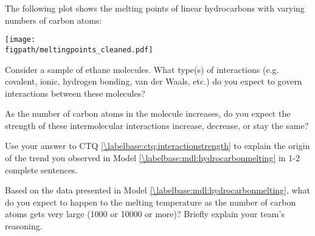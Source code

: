 \begin{activity}
\begin{model}
	The following plot shows the melting points of linear hydrocarbons with varying numbers of carbon atoms:
	
	\vspace{6pt}
	
	\centerline{\texttt{[image: \\figpath/meltingpoints\_cleaned.pdf]}}
	
	\vspace{6pt}

\end{model}

\begin{ctqs}

	
	
	\question Consider a sample of ethane molecules.  What type(s) of interactions (e.g. covalent, ionic, hydrogen bonding, van der Waals, etc.) do you expect to govern interactions between these molecules?%
	
		\begin{solution}[0.5in]
		\end{solution}
	
	\question As the number of carbon atoms in the molecule increases, do you expect the strength of these intermolecular interactions increase, decrease, or stay the same? \label{\labelbase:ctq:interactionstrength}
	
		\begin{solution}[0.5in]
		\end{solution}
	
	\question Use your answer to CTQ \ref{\labelbase:ctq:interactionstrength} to explain the origin of the trend you observed in Model \ref{\labelbase:mdl:hydrocarbonmelting} in 1-2 complete sentences.
	
		\begin{solution}[2in]
		\end{solution}
	
	\question Based on the data presented in Model \ref{\labelbase:mdl:hydrocarbonmelting}, what do you expect to happen to the melting temperature as the number of carbon atoms gets very large (1000 or 10000 or more)?  Briefly explain your team's reasoning.
	
		\begin{solution}[2in]
		\end{solution}
	

\end{ctqs}
\end{activity}
